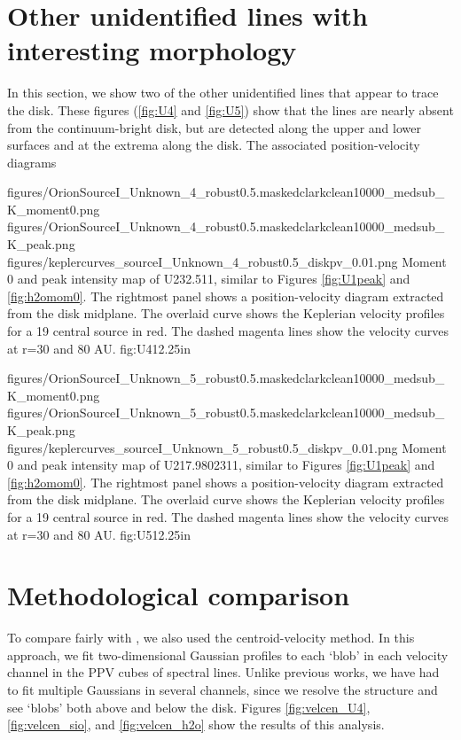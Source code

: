 \documentclass[twocolumn]{aastex61}
\begin{document}


\appendix
\section{Other unidentified lines with interesting morphology}
\label{sec:otherlines}
In this section, we show two of the other unidentified lines that appear to trace
the disk.  These figures (\ref{fig:U4} and \ref{fig:U5}) show that the lines
are nearly absent from the continuum-bright disk, but are detected along the upper and
lower surfaces and at the extrema along the disk.  The associated position-velocity diagrams

\FigureThree
{{figures/OrionSourceI_Unknown_4_robust0.5.maskedclarkclean10000_medsub_K_moment0}.png}
{{figures/OrionSourceI_Unknown_4_robust0.5.maskedclarkclean10000_medsub_K_peak}.png}
{{figures/keplercurves_sourceI_Unknown_4_robust0.5_diskpv_0.01}.png}
{Moment 0 and peak intensity map of U232.511, similar to Figures \ref{fig:U1peak} and \ref{fig:h2omom0}.
The rightmost panel shows a position-velocity diagram extracted from the disk midplane.
The overlaid  curve shows the Keplerian velocity profiles for a 19 \msun central source in red.
The dashed magenta lines show the velocity curves at r=30 and 80 AU.
}
{fig:U4}{1}{2.25in}

\FigureThree
{{figures/OrionSourceI_Unknown_5_robust0.5.maskedclarkclean10000_medsub_K_moment0}.png}
{{figures/OrionSourceI_Unknown_5_robust0.5.maskedclarkclean10000_medsub_K_peak}.png}
{{figures/keplercurves_sourceI_Unknown_5_robust0.5_diskpv_0.01}.png}
{Moment 0 and peak intensity map of U217.9802311, similar to Figures \ref{fig:U1peak} and \ref{fig:h2omom0}.
The rightmost panel shows a position-velocity diagram extracted from the disk midplane.
The overlaid  curve shows the Keplerian velocity profiles for a 19 \msun central source in red.
The dashed magenta lines show the velocity curves at r=30 and 80 AU.
}
{fig:U5}{1}{2.25in}

\section{Methodological comparison}
\label{appendix:centroids}
To compare fairly with \citet{Plambeck2016a}, we also used the
centroid-velocity method.  In this approach, we fit two-dimensional Gaussian
profiles to each `blob' in each velocity channel in the PPV cubes of spectral
lines.  Unlike previous works, we have had to fit multiple Gaussians in several
channels, since we resolve the structure and see `blobs' both above and below
the disk.
Figures \ref{fig:velcen_U4}, \ref{fig:velcen_sio}, and \ref{fig:velcen_h2o}
show the results of this analysis.
\end{document}
